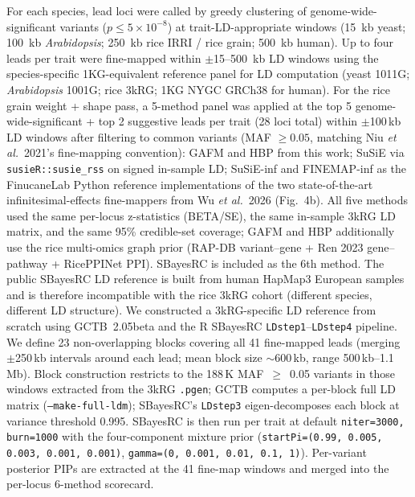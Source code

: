 For each species, lead loci were called by greedy clustering of
genome-wide-significant variants ($p \leq 5\times10^{-8}$) at
trait-LD-appropriate windows (15~kb yeast; 100~kb \emph{Arabidopsis};
250~kb rice IRRI / rice grain;
500~kb human). Up to four leads per trait were
fine-mapped within $\pm$15--500~kb LD windows using the
species-specific 1KG-equivalent reference panel for LD computation
(yeast 1011G; \emph{Arabidopsis} 1001G; rice 3kRG;
1KG NYGC GRCh38 for human). For the rice grain weight + shape pass, a 5-method panel was
applied at the top 5 genome-wide-significant + top 2 suggestive
leads per trait (28 loci total) within $\pm$100\,kb LD windows
after filtering to
common variants (MAF $\geq 0.05$, matching Niu \emph{et al.}\ 2021's
fine-mapping convention): GAFM and HBP from this work; SuSiE
\cite{wang2020simple} via \texttt{susieR::susie\_rss} on signed
in-sample LD; SuSiE-inf and FINEMAP-inf
\cite{cui2024improving} as the FinucaneLab Python reference
implementations of the two state-of-the-art infinitesimal-effects
fine-mappers from Wu \emph{et al.}\ 2026 (Fig.~4b). All five
methods used the same per-locus z-statistics (BETA/SE), the same
in-sample 3kRG LD matrix, and the same 95\% credible-set
coverage; GAFM and HBP additionally use the rice multi-omics graph
prior (RAP-DB variant--gene + Ren 2023 gene--pathway +
RicePPINet PPI). SBayesRC \cite{zheng2024leveraging} is included as the 6th method.
The public SBayesRC LD reference is built from human HapMap3
European samples and is therefore incompatible with the rice
3kRG cohort (different species, different LD structure). We
constructed a 3kRG-specific LD reference from scratch using
GCTB\cite{zeng2018gctb}~2.05beta and the R
SBayesRC \texttt{LDstep1}--\texttt{LDstep4} pipeline. We define
23 non-overlapping blocks covering all 41 fine-mapped leads
(merging $\pm$250\,kb intervals around each lead; mean block
size $\sim$600\,kb, range 500\,kb--1.1\,Mb). Block construction
restricts to the 188\,K MAF~$\geq$~0.05 variants in those windows
extracted from the 3kRG \texttt{.pgen}; GCTB computes a per-block
full LD matrix (\texttt{--make-full-ldm}); SBayesRC's
\texttt{LDstep3} eigen-decomposes each block at variance
threshold 0.995. SBayesRC is then run per trait at default
\texttt{niter=3000, burn=1000} with the four-component mixture
prior (\texttt{startPi=(0.99, 0.005, 0.003, 0.001, 0.001)},
\texttt{gamma=(0, 0.001, 0.01, 0.1, 1)}). Per-variant posterior
PIPs are extracted at the 41 fine-map windows and merged into
the per-locus 6-method scorecard.

